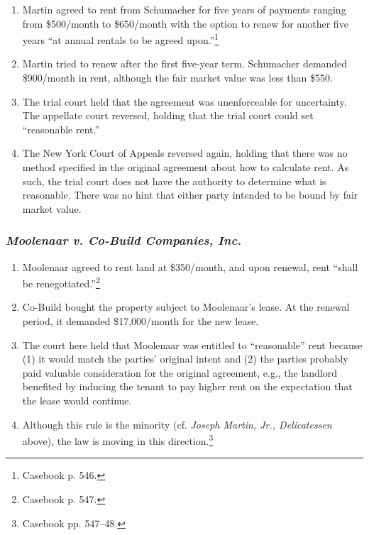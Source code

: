 \begin{enumerate}
    \item Martin agreed to rent from Schumacher for five years of payments 
    ranging from \$500/month to \$650/month with the option to renew for 
    another five years ``at annual rentals to be agreed 
    upon.''\footnote{Casebook p. 546.}
    \item Martin tried to renew after the first five-year term. Schumacher 
    demanded \$900/month in rent, although the fair market value was less than 
    \$550.
    \item The trial court held that the agreement was unenforceable for 
    uncertainty. The appellate court reversed, holding that the trial court 
    could set ``reasonable rent.''
    \item The New York Court of Appeals reversed again, holding that there was 
    no method specified in the original agreement about how to calculate rent. 
    As such, the trial court does not have the authority to determine what is 
    reasonable. There was no hint that either party intended to be bound by 
    fair market value.
\end{enumerate}

\subsubsection{\emph{Moolenaar v. Co-Build Companies, Inc.}}

\begin{enumerate}
    \item Moolenaar agreed to rent land at \$350/month, and upon renewal, rent 
    ``shall be renegotiated.''\footnote{Casebook p. 547.}
    \item Co-Build bought the property subject to Moolenaar's lease. At the 
    renewal period, it demanded \$17,000/month for the new lease.
    \item The court here held that Moolenaar was entitled to ``reasonable'' 
    rent because (1) it would match the parties' original intent and (2) the 
    parties probably paid valuable consideration for the original agreement, 
    e.g., the landlord benefited by inducing the tenant to pay higher rent on 
    the expectation that the lease would continue.
    \item Although this rule is the minority (cf. \emph{Joseph Martin, Jr., 
    Delicatessen} above), the law is moving in this 
    direction.\footnote{Casebook pp. 547--48.}
\end{enumerate}


